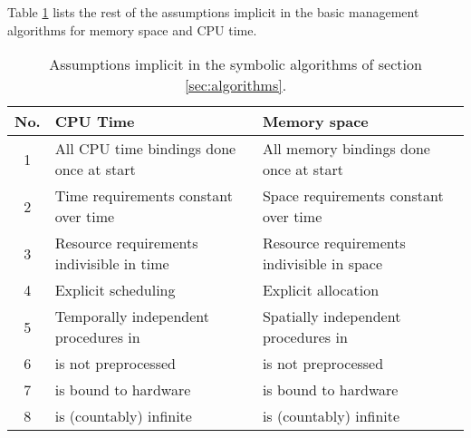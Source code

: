 \documentclass[draft]{article}
\begin{document}
Table \ref{tab:assumptions} lists the rest of the assumptions implicit
in the basic management algorithms for memory space and CPU time.
\begin{table}[t]
  \begin{center}
    \begin{tabular}[h]{|c|l|l|}
      \hline
      \textbf{No.} & \textbf{CPU Time} & \textbf{Memory space} \\
      \hline
      1 &
      All CPU time bindings done once at start &
      All memory bindings done once at start \\
      2 &
      Time requirements constant over time &
      Space requirements constant over time \\
      3 &
      Resource requirements indivisible in time &
      Resource requirements indivisible in space \\
      4 &
      Explicit scheduling &
      Explicit allocation \\
      5 &
      Temporally independent procedures in  &
      Spatially independent procedures in   \\
      6 &
       is not preprocessed &
       is not preprocessed \\
      7 &
       is bound to hardware &
       is bound to hardware \\
      8 &
       is (countably) infinite &
       is (countably) infinite \\
      \hline
    \end{tabular}
  \end{center}
  \caption[Implicit assumptions]{Assumptions implicit in the symbolic
  algorithms of section \ref{sec:algorithms}.}
  \label{tab:assumptions}
\end{table}
\end{document}

